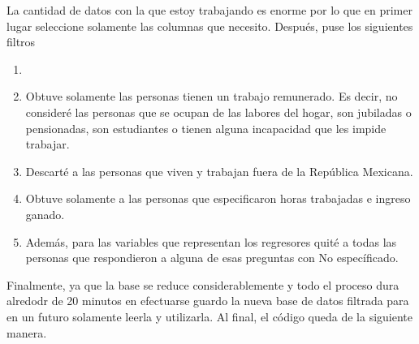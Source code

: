 La cantidad de datos con la que estoy trabajando es enorme por lo que en primer lugar seleccione solamente las columnas que necesito. Después, puse los siguientes filtros 

\begin{enumerate}
    \item 
    \item Obtuve solamente las personas tienen un trabajo remunerado. Es decir, no consideré las personas que
    se ocupan de las labores del hogar, son jubiladas o pensionadas, son estudiantes o tienen alguna incapacidad que les impide trabajar. 
    
    \item Descarté a las personas que viven y trabajan fuera de la República Mexicana. 
    
    \item Obtuve solamente a las personas que especificaron horas trabajadas e ingreso ganado.
    
    \item Además, para las variables que representan los regresores quité a todas las personas que respondieron a alguna de esas preguntas con \textsf{No específicado}. 
\end{enumerate}

Finalmente, ya que la base se reduce considerablemente y todo el proceso dura alredodr de 20 minutos en efectuarse guardo la nueva base de datos filtrada para en un futuro solamente leerla y utilizarla. Al final, el código queda de la siguiente manera.

